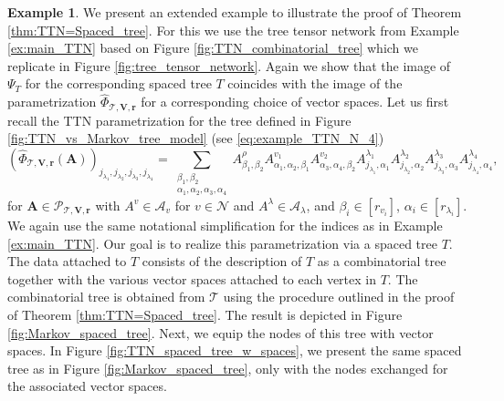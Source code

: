 \documentclass[12pt]{article}
\theoremstyle{definition}
\newtheorem{example}[theorem]{Example}
\numberwithin{theorem}{section}
\begin{document}
\begin{example} We present an extended example to illustrate the proof of Theorem \ref{thm:TTN=Spaced_tree}. For this we use the tree tensor network from Example \ref{ex:main_TTN} based on Figure \ref{fig:TTN_combinatorial_tree} which we replicate in Figure \ref{fig:tree_tensor_network}. Again we show that the image of $\Psi_T$ for the corresponding spaced tree $T$ coincides with the image of the parametrization $\widehat{\Phi}_{\mathscr T,\mathbf V,\mathbf r}$ for a corresponding choice of vector spaces.
Let us first recall the TTN parametrization for the tree defined in Figure \ref{fig:TTN_vs_Markov_tree_model} (see \eqref{eq:example_TTN_N_4})
\begin{equation}\label{eq:TTN_param_ex}
    (\widehat{\Phi}_{\mathscr T,\mathbf V,\mathbf r}(\mathbf{A}))_{j_{\lambda_1},j_{\lambda_2},j_{\lambda_3},j_{\lambda_4}} = \sum_{\substack{\beta_1, \beta_2 \\ \alpha_1, \alpha_2, \alpha_3, \alpha_4}} A^\rho_{\beta_1,\beta_2}A^{v_1}_{\alpha_1,\alpha_2, \beta_1}A^{v_2}_{\alpha_3,\alpha_4, \beta_2} A^{\lambda_1}_{j_{\lambda_1},\alpha_1} A^{\lambda_2}_{j_{\lambda_2},\alpha_2}A^{\lambda_3}_{j_{\lambda_3},\alpha_3} A^{\lambda_4}_{j_{\lambda_4},\alpha_4},
\end{equation}
for $\mathbf{A} \in \mathcal{P}_{\mathscr{T}, \mathbf{V}, \mathbf{r}}$ with $A^v \in \mathcal{A}_v$ for $v \in \mathscr{N}$ and $A^\lambda \in \mathcal{A}_\lambda$, and $\beta_i \in [r_{v_i}]$, $\alpha_i \in [r_{\lambda_i}]$. We again use the same notational simplification for the indices as in Example \ref{ex:main_TTN}.
Our goal is to realize this parametrization via a spaced tree $T$. 
The data attached to $T$ consists of the description of $T$ as a combinatorial tree together with the various vector spaces attached to each vertex in $T$. The combinatorial tree is obtained from $\mathscr T$ using the procedure outlined in the proof of Theorem \ref{thm:TTN=Spaced_tree}. The result is depicted in Figure \ref{fig:Markov_spaced_tree}. 
Next, we equip the nodes of this tree with vector spaces.  In Figure \ref{fig:TTN_spaced_tree_w_spaces}, we present the same spaced tree as in Figure \ref{fig:Markov_spaced_tree}, only with the nodes exchanged for the associated vector spaces. 
\begin{figure}[htbp]
\centering
\setlength{\abovecaptionskip}{3pt}
\setlength{\belowcaptionskip}{-3pt}


\begin{subfigure}[t]{0.48\textwidth}
\centering
{}
\end{subfigure}
\end{figure}
\end{example}
\end{document}
